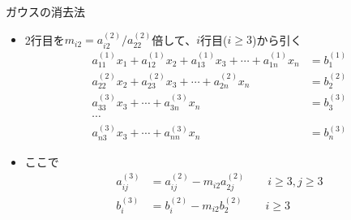 \begin{frame}[t,fragile]{ガウスの消去法}
  \begin{itemize}
    \setlength{\itemsep}{1em}
  \item 2行目を$m_{i2} = a_{i2}^{(2)}/a_{22}^{(2)}$倍して、$i$行目($i \ge 3$)から引く
    \begin{align*}
    a_{11}^{(1)} x_1 + a_{12}^{(1)} x_2 + a_{13}^{(1)} x_3 + \cdots + a_{1n}^{(1)} x_n &= b_{1}^{(1)} \\
    a_{22}^{(2)} x_2 + a_{23}^{(2)} x_3 + \cdots + a_{2n}^{(2)} x_n &= b_{2}^{(2)} \\
    a_{33}^{(3)} x_3 + \cdots + a_{3n}^{(3)} x_n &= b_{3}^{(3)} \\
    \cdots \\
    a_{n3}^{(3)} x_3 + \cdots + a_{nn}^{(3)} x_n &= b_{n}^{(3)}
    \end{align*}
  \item ここで
    \begin{align*}
      a_{ij}^{(3)} &= a_{ij}^{(2)} - m_{i2} a_{2j}^{(2)} \qquad i \ge 3, j \ge 3 \\
      b_{i}^{(3)} &= b_{i}^{(2)} - m_{i2} b_{2}^{(2)} \qquad i \ge 3
    \end{align*}
  \end{itemize}
\end{frame}
